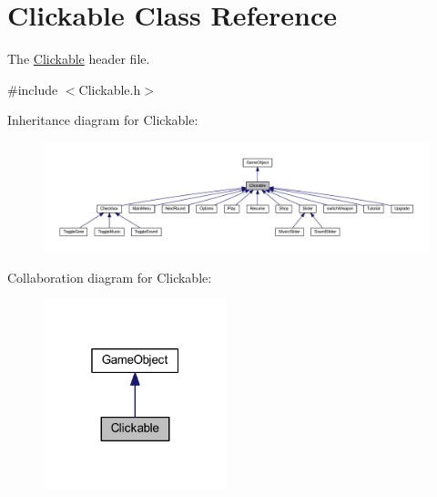 \hypertarget{class_clickable}{\section{Clickable Class Reference}
\label{class_clickable}
}


The \hyperlink{class_clickable}{Clickable} header file.  




{\ttfamily \#include $<$Clickable.\+h$>$}



Inheritance diagram for Clickable\+:\nopagebreak
\begin{figure}[H]
\begin{center}
\leavevmode
\includegraphics[width=350pt]{class_clickable__inherit__graph}
\end{center}
\end{figure}


Collaboration diagram for Clickable\+:\nopagebreak
\begin{figure}[H]
\begin{center}
\leavevmode
\includegraphics[width=151pt]{class_clickable__coll__graph}
\end{center}
\end{figure}
